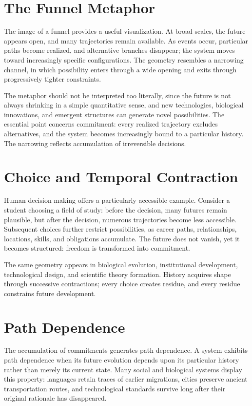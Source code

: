 \documentclass[11pt,oneside]{book}
\theoremstyle{plain}
\theoremstyle{definition}
\theoremstyle{remark}
\begin{document}
\section{The Funnel Metaphor}

The image of a funnel provides a useful visualization. At broad scales, the future appears open, and many trajectories remain available. As events occur, particular paths become realized, and alternative branches disappear; the system moves toward increasingly specific configurations. The geometry resembles a narrowing channel, in which possibility enters through a wide opening and exits through progressively tighter constraints.

The metaphor should not be interpreted too literally, since the future is not always shrinking in a simple quantitative sense, and new technologies, biological innovations, and emergent structures can generate novel possibilities. The essential point concerns commitment: every realized trajectory excludes alternatives, and the system becomes increasingly bound to a particular history. The narrowing reflects accumulation of irreversible decisions.

\section{Choice and Temporal Contraction}

Human decision making offers a particularly accessible example. Consider a student choosing a field of study: before the decision, many futures remain plausible, but after the decision, numerous trajectories become less accessible. Subsequent choices further restrict possibilities, as career paths, relationships, locations, skills, and obligations accumulate. The future does not vanish, yet it becomes structured: freedom is transformed into commitment.

The same geometry appears in biological evolution, institutional development, technological design, and scientific theory formation. History acquires shape through successive contractions; every choice creates residue, and every residue constrains future development.

\section{Path Dependence}

The accumulation of commitments generates path dependence. A system exhibits path dependence when its future evolution depends upon its particular history rather than merely its current state. Many social and biological systems display this property: languages retain traces of earlier migrations, cities preserve ancient transportation routes, and technological standards survive long after their original rationale has disappeared.
\end{document}
